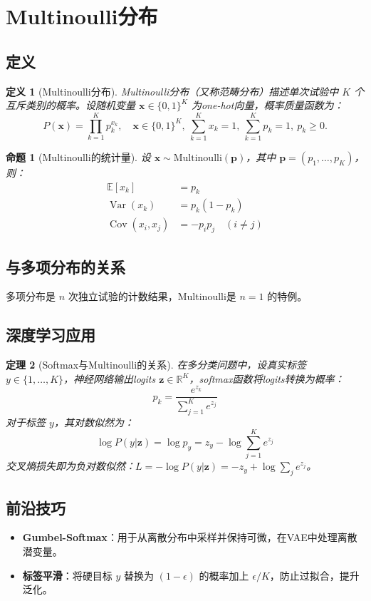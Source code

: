 \documentclass[UTF8, 10pt]{ctexart}
\newtheorem{theorem}{定理}[section]
\newtheorem{definition}{定义}[section]
\newtheorem{proposition}[theorem]{命题}
\newcommand{\R}{\mathbb{R}}
\newcommand{\E}{\mathbb{E}}
\newcommand{\Var}{\operatorname{Var}}
\newcommand{\Cov}{\operatorname{Cov}}
\begin{document}
\section{Multinoulli分布}
\subsection{定义}
\begin{definition}[Multinoulli分布]
Multinoulli分布（又称范畴分布）描述单次试验中 $K$ 个互斥类别的概率。设随机变量 $\bm{x} \in \{0,1\}^K$ 为one-hot向量，概率质量函数为：
\[
P(\bm{x}) = \prod_{k=1}^K p_k^{x_k},\quad \bm{x} \in \{0,1\}^K,\ \sum_{k=1}^K x_k = 1,\ \sum_{k=1}^K p_k = 1,\ p_k \ge 0.
\]
\end{definition}

\begin{proposition}[Multinoulli的统计量]
设 $\bm{x} \sim \text{Multinoulli}(\bm{p})$，其中 $\bm{p} = (p_1, \ldots, p_K)$，则：
\begin{align*}
    \E[x_k] &= p_k \\
    \Var(x_k) &= p_k(1 - p_k) \\
    \Cov(x_i, x_j) &= -p_i p_j \quad (i \neq j)
\end{align*}
\end{proposition}

\subsection{与多项分布的关系}
多项分布是 $n$ 次独立试验的计数结果，Multinoulli是 $n=1$ 的特例。

\subsection{深度学习应用}
\begin{theorem}[Softmax与Multinoulli的关系]
在多分类问题中，设真实标签 $y \in \{1, \ldots, K\}$，神经网络输出logits $\bm{z} \in \R^K$，softmax函数将logits转换为概率：
\[
p_k = \frac{e^{z_k}}{\sum_{j=1}^K e^{z_j}}
\]
对于标签 $y$，其对数似然为：
\[
\log P(y|\bm{z}) = \log p_y = z_y - \log\sum_{j=1}^K e^{z_j}
\]
交叉熵损失即为负对数似然：$L = -\log P(y|\bm{z}) = -z_y + \log\sum_j e^{z_j}$。
\end{theorem}

\subsection{前沿技巧}
\begin{itemize}
    \item \textbf{Gumbel-Softmax}：用于从离散分布中采样并保持可微，在VAE中处理离散潜变量。
    \item \textbf{标签平滑}：将硬目标 $y$ 替换为 $(1-\epsilon)$ 的概率加上 $\epsilon/K$，防止过拟合，提升泛化。
\end{itemize}
\end{document}
